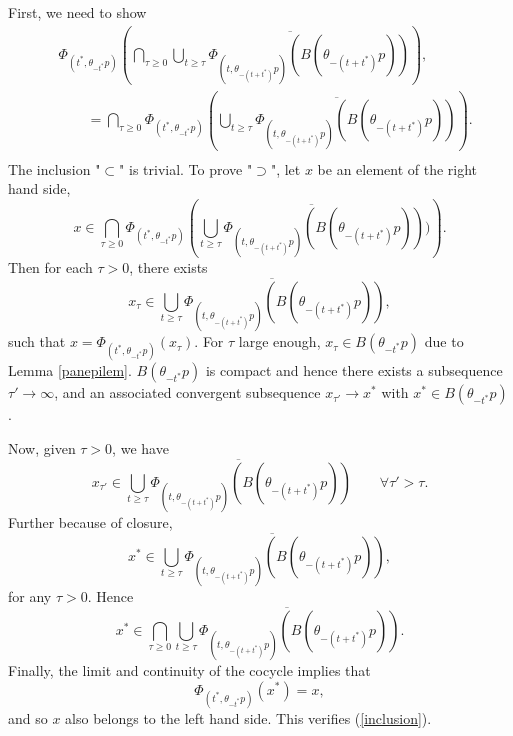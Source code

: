 \begin{prf}
  First, we need to show
  \begin{equation}\label{inclusion}
  \begin{split}
  & \Phi_{(t^*, \theta_{-t^*}p)}\left(\bigcap_{\tau \geq 0} \overline{
\bigcup_{t         \geq \tau} \Phi_{(t, \theta_{-(t + t^*)}p)} (B(\theta_{-(t +
        t^*)}p))}\right), \\
  & \qquad = \bigcap_{\tau \geq 0} \Phi_{(t^*, \theta_{-t^*}p)}\left( \overline{
     \bigcup_{t \geq \tau} \Phi_{(t, \theta_{-(t + t^*)}p)} (B(\theta_{-(t +
        t^*)}p))}\right). \\
  \end{split}
  \end{equation}
  The inclusion "$\subset$" is trivial. To prove "$\supset$", let $x$ be an element
  of the right hand side,
  \[ x \in \bigcap_{\tau \geq 0} \Phi_{(t^*, \theta_{-t^*}p)}\left( \overline{
     \bigcup_{t \geq \tau} \Phi_{(t, \theta_{-(t + t^*)}p)} (B(\theta_{-(t +
        t^*)}p))})\right). \]
  Then for each $\tau > 0$, there exists
  \[ x_{\tau} \in \overline{\bigcup_{t \geq \tau} \Phi_{(t, \theta_{-(t +
        t^*)}p)} (B(\theta_{-(t + t^*)}p))}, \]
  such that $x = \Phi_{(t^*, \theta_{-t^*}p)}(x_{\tau})$. For $\tau$ large
  enough, $x_{\tau} \in B(\theta_{-t^*}p)$ due to Lemma \ref{panepilem}.
  $B(\theta_{-t^*}p)$ is compact and hence there exists a subsequence
  $\tau' \to \infty$, and an associated convergent subsequence
  $x_{\tau'} \to x^*$ with $x^* \in B(\theta_{-t^*}p)$.

  Now, given $\tau > 0$, we have
  \[ x_{\tau'} \in \overline{\bigcup_{t \geq \tau} \Phi_{(t, \theta_{-(t +
        t^*)}p)} (B(\theta_{-(t + t^*)}p))} \qquad \forall \tau' > \tau. \]
  Further because of closure,
  \[ x^* \in \overline{\bigcup_{t \geq \tau} \Phi_{(t, \theta_{-(t +
        t^*)}p)} (B(\theta_{-(t + t^*)}p))}, \]
  for any $\tau > 0$. Hence
  \[ x^* \in \bigcap_{\tau \geq 0} \overline{\bigcup_{t \geq \tau} \Phi_{(t,
        \theta_{-(t + t^*)}p)} (B(\theta_{-(t + t^*)}p))}. \]
  Finally, the limit and continuity of the cocycle implies that
  \[ \Phi_{(t^*,\theta_{-t^*}p)}(x^*) = x, \]
  and so $x$ also belongs to
  the left hand side. This verifies (\ref{inclusion}).


\end{prf}
